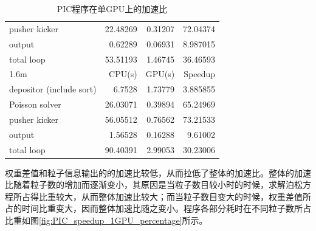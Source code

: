\begin{table}
\begin{tabular}{|l|r|r|r|}
    pusher kicker            &    22.48269	  &     0.31207	  &  72.04374   \\
    output                   &    0.62289     &     0.06931   &  8.987015   \\
    total loop               &    53.51193    &     1.46745   &  36.46593   \\
    \hline
    1.6m                     &    CPU(s)      &     GPU(s)    &  Speedup    \\
    \hline
    depositor (include sort) &    6.7528      &     1.73779   &  3.885855   \\
    Poisson solver           &    26.03071    &     0.39894   &  65.24969   \\
    pusher kicker            &    56.05512	  &     0.76562	  &  73.21533   \\
    output                   &    1.56528     &     0.16288   &  9.61002    \\
    total loop               &    90.40391    &     2.99053   &  30.23006   \\
    \hline
  \end{tabular}
  \caption{PIC程序在单GPU上的加速比}
  \label{tab:PIC_speedup_1GPU}
\end{table}

权重差值和粒子信息输出的的加速比较低，从而拉低了整体的加速比。整体的加速比随着粒子数的增加而逐渐变小，其原因是当粒子数目较小时的时候，求解泊松方程所占得比重较大，从而整体加速比较大；而当粒子数目变大的时候，权重差值所占的时间比重变大，因而整体加速比随之变小。程序各部分耗时在不同粒子数所占比重如图\ref{fig:PIC_speedup_1GPU_percentage}所示。


